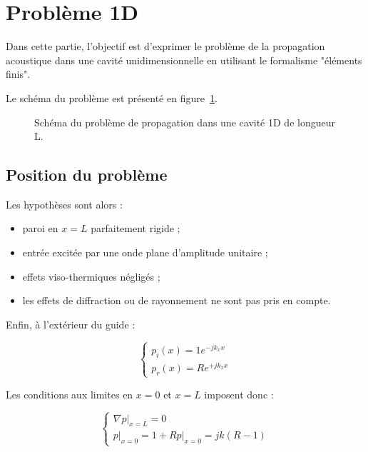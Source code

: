 \section{Problème 1D}

Dans cette partie, l'objectif est d'exprimer le problème de la propagation acoustique dans une cavité unidimensionnelle
en utilisant le formalisme "éléments finis".

Le schéma du problème est présenté en figure~\ref{fig:FEM:propa_1D}.

\begin{figure}[!ht]
	\centering
	
	\caption{\label{fig:FEM:propa_1D}Schéma du problème de propagation dans une cavité 1D de longueur L.}
\end{figure}

\subsection{Position du problème}

Les hypothèses sont alors :

\begin{itemize}
	\item paroi en $x=L$ parfaitement rigide ;
	\item entrée excitée par une onde plane d'amplitude unitaire ;
	\item effets viso-thermiques négligés ;
	\item les effets de diffraction ou de rayonnement ne sont pas pris en compte.
\end{itemize}

Enfin, à l'extérieur du guide :

\begin{equation}
	\left\{
	\begin{array}{l}
		p_i(x) = 1e^{-jk_xx}\\
		p_r(x) = Re^{+jk_xx}
	\end{array}
	\right.\label{FEM1D:expr_ondes}
\end{equation}

Les conditions aux limites en $x=0$ et $x=L$ imposent donc :

\begin{equation}
	\left\{\begin{array}{l}
	\left.\nabla p\right|_{x=L} = 0\\
	\left.p\right|_{x=0} = 1+R
	\left.p\right|_{x=0} = jk(R-1)
	\end{array}\right. \label{FEM1D:BC}
\end{equation}


